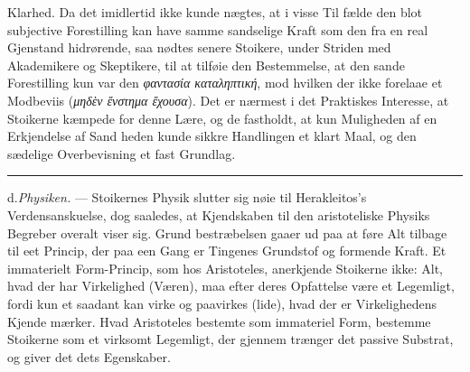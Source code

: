 \documentclass[12pt,a4paper]{book}
\newcommand{\divrule}{\begin{center}\rule{2cm}{0.4pt}\end{center}}
\newcommand{\gk}[1]{\textit{#1}}
\begin{document}
Klarhed. Da det imidlertid ikke kunde nægtes, at i visse Til\-%
fælde den blot subjective Forestilling kan have samme sandselige
Kraft som den fra en real Gjenstand hidrørende, saa nødtes
senere Stoikere, under Striden med Akademikere og Skeptikere,
til at tilføie den Bestemmelse, at den sande Forestilling kun
var den \gk{φαντασία καταληπτική}, mod hvilken der ikke forelaae
et Modbeviis (\gk{μηδὲν ἔνστημα ἔχουσα}). Det er nærmest i det
Praktiskes Interesse, at Stoikerne kæmpede for denne Lære,
og de fastholdt, at kun Muligheden af en Erkjendelse af Sand\-%
heden kunde sikkre Handlingen et klart Maal, og den sædelige
Overbevisning et fast Grundlag.
\divrule

d.\enspace \emph{Physiken.} --- Stoikernes Physik slutter sig nøie til
Herakleitos's Verdensanskuelse, dog saaledes, at Kjendskaben
til den aristoteliske Physiks Begreber overalt viser sig. Grund\-%
bestræbelsen gaaer ud paa at føre Alt tilbage til eet Princip,
der paa een Gang er Tingenes Grundstof og formende Kraft.
Et immaterielt Form-Princip, som hos Aristoteles, anerkjende
Stoikerne ikke: Alt, hvad der har Virkelighed (Væren), maa
efter deres Opfattelse være et Legemligt, fordi kun et saadant
kan virke og paavirkes (lide), hvad der er Virkelighedens Kjende\-%
mærker. Hvad Aristoteles bestemte som immateriel Form,
bestemme Stoikerne som et virksomt Legemligt, der gjennem\-%
trænger det passive Substrat, og giver det dets Egenskaber.
\end{document}
